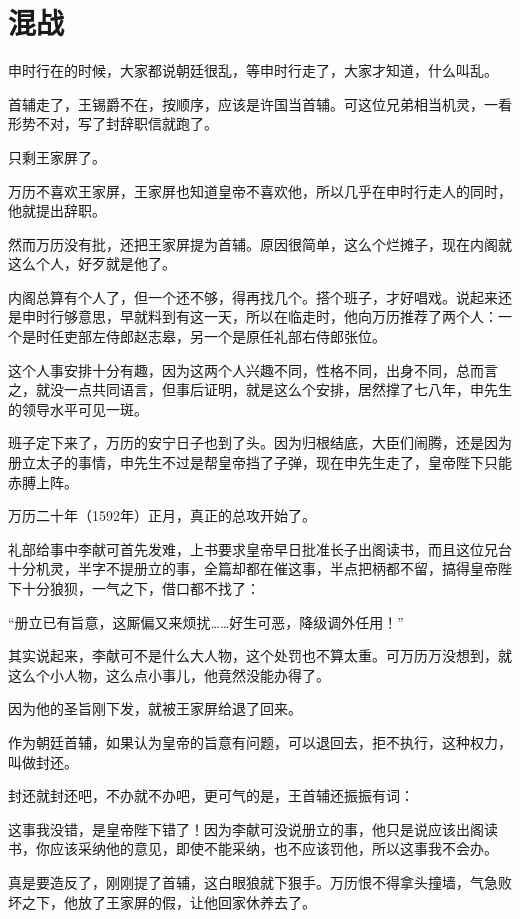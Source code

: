 \section{混战}
\ifnum{}
	\begin{multicols}{\theparacolNo}
		\fi
		申时行在的时候，大家都说朝廷很乱，等申时行走了，大家才知道，什么叫乱。

		首辅走了，王锡爵不在，按顺序，应该是许国当首辅。可这位兄弟相当机灵，一看形势不对，写了封辞职信就跑了。

		只剩王家屏了。

		万历不喜欢王家屏，王家屏也知道皇帝不喜欢他，所以几乎在申时行走人的同时，他就提出辞职。

		然而万历没有批，还把王家屏提为首辅。原因很简单，这么个烂摊子，现在内阁就这么个人，好歹就是他了。

		内阁总算有个人了，但一个还不够，得再找几个。搭个班子，才好唱戏。说起来还是申时行够意思，早就料到有这一天，所以在临走时，他向万历推荐了两个人：一个是时任吏部左侍郎赵志皋，另一个是原任礼部右侍郎张位。

		这个人事安排十分有趣，因为这两个人兴趣不同，性格不同，出身不同，总而言之，就没一点共同语言，但事后证明，就是这么个安排，居然撑了七八年，申先生的领导水平可见一斑。

		班子定下来了，万历的安宁日子也到了头。因为归根结底，大臣们闹腾，还是因为册立太子的事情，申先生不过是帮皇帝挡了子弹，现在申先生走了，皇帝陛下只能赤膊上阵。

		万历二十年（1592年）正月，真正的总攻开始了。

		礼部给事中李献可首先发难，上书要求皇帝早日批准长子出阁读书，而且这位兄台十分机灵，半字不提册立的事，全篇却都在催这事，半点把柄都不留，搞得皇帝陛下十分狼狈，一气之下，借口都不找了：

		“册立已有旨意，这厮偏又来烦扰……好生可恶，降级调外任用！”

		其实说起来，李献可不是什么大人物，这个处罚也不算太重。可万历万没想到，就这么个小人物，这么点小事儿，他竟然没能办得了。

		因为他的圣旨刚下发，就被王家屏给退了回来。

		作为朝廷首辅，如果认为皇帝的旨意有问题，可以退回去，拒不执行，这种权力，叫做封还。

		封还就封还吧，不办就不办吧，更可气的是，王首辅还振振有词：

		这事我没错，是皇帝陛下错了！因为李献可没说册立的事，他只是说应该出阁读书，你应该采纳他的意见，即使不能采纳，也不应该罚他，所以这事我不会办。

		真是要造反了，刚刚提了首辅，这白眼狼就下狠手。万历恨不得拿头撞墙，气急败坏之下，他放了王家屏的假，让他回家休养去了。


\end{multicols}
